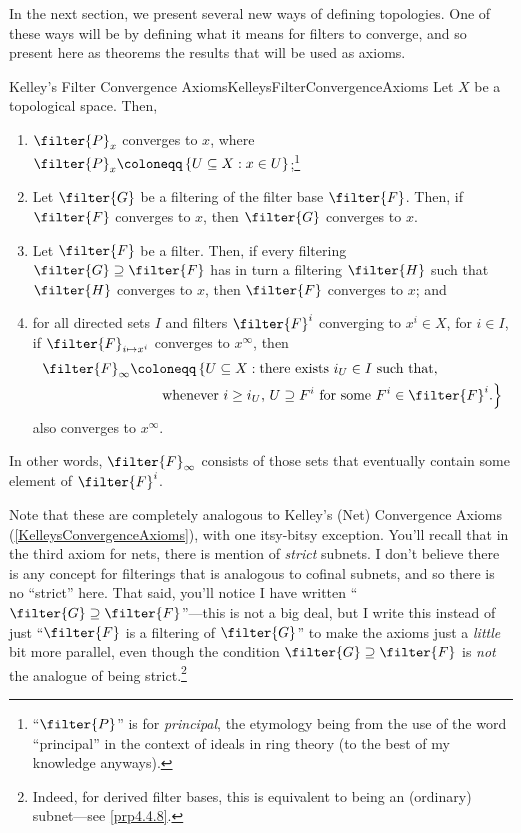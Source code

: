 In the next section, we present several new ways of defining topologies.  One of these ways will be by defining what it means for filters to converge, and so present here as theorems the results that will be used as axioms.
\begin{prp}{Kelley's Filter Convergence Axioms}{KelleysFilterConvergenceAxioms}
Let $X$ be a topological space.  Then,
\begin{enumerate}
\item \label{enmKelleysFilterConvergenceAxioms.i}$\filter{P}_x$ converges to $x$, where $\filter{P}_x\coloneqq \left\{ U\subseteq X:x\in U\right\}$;\footnote{``$\filter{P}$'' is for \emph{principal}, the etymology being from the use of the word ``principal'' in the context of ideals in ring theory (to the best of my knowledge anyways).}
\item \label{enmKelleysFilterConvergenceAxioms.iix}Let $\filter{G}$ be a filtering of the filter base $\filter{F}$.  Then, if $\filter{F}$ converges to $x$, then $\filter{G}$ converges to $x$.
\item \label{enmKelleysFilterConvergenceAxioms.ii}Let $\filter{F}$ be a filter.  Then, if every filtering $\filter{G}\supseteq \filter{F}$ has in turn a filtering $\filter{H}$ such that $\filter{H}$ converges to $x$, then $\filter{F}$ converges to $x$; and
\item \label{enmKelleysFilterConvergenceAxioms.iii}for all directed sets $I$ and filters $\filter{F}^i$ converging to $x^i\in X$, for $i\in I$, if $\filter{F}_{i\mapsto x^i}$ converges to $x^\infty$, then
\begin{equation}
\begin{split}
\filter{F}_\infty & \coloneqq \left\{ U\subseteq X:\text{there exists }i_U\in I\text{ such that,}\right. \\
& \qquad \left. \text{whenever }i\geq i_U\text{, }U\supseteq F^i\text{ for some }F^i\in \filter{F}^i.\right\}
\end{split}
\end{equation}
also converges to $x^\infty$.
\end{enumerate}
\begin{rmk}
In other words, $\filter{F}_{\infty}$ consists of those sets that eventually contain some element of $\filter{F}^i$.
\end{rmk}
\begin{rmk}
Note that these are completely analogous to Kelley's (Net) Convergence Axioms (\cref{KelleysConvergenceAxioms}), with one itsy-bitsy exception.  You'll recall that in the third axiom for nets, there is mention of \emph{strict} subnets.  I don't believe there is any concept for filterings that is analogous to cofinal subnets, and so there is no ``strict'' here.  That said, you'll notice I have written ``$\filter{G}\supseteq \filter{F}$''---this is not a big deal, but I write this instead of just ``$\filter{F}$ is a filtering of $\filter{G}$'' to make the axioms just a \emph{little} bit more parallel, even though the condition $\filter{G}\supseteq \filter{F}$ is \emph{not} the analogue of being strict.\footnote{Indeed, for derived filter bases, this is equivalent to being an (ordinary) subnet---see \cref{prp4.4.8}.}

\end{rmk}
\end{prp}
